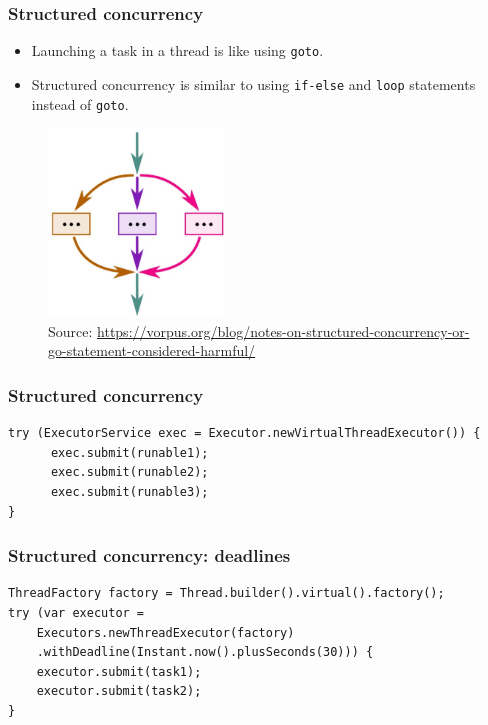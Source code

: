 \documentclass[10pt,utf8]{beamer}
\begin{document}
\begin{frame}
    \frametitle{Structured concurrency}
    \begin{itemize}
        \item Launching a task in a thread is like using \texttt{goto}.
        \item Structured concurrency is similar to using \texttt{if-else} and \texttt{loop} statements instead of \texttt{goto}.
    \end{itemize}

    \begin{figure}
        \centering
        \includegraphics[height=5cm]{./img/structured_concurrency.eps}
        \caption{\tiny{Source: \url{https://vorpus.org/blog/notes-on-structured-concurrency-or-go-statement-considered-harmful/}}}
    \end{figure}
\end{frame}

\begin{frame}[fragile]
    \frametitle{Structured concurrency}

    \begin{lstlisting}[style=java]
try (ExecutorService exec = Executor.newVirtualThreadExecutor()) {
      exec.submit(runable1);
      exec.submit(runable2);
      exec.submit(runable3);
}
    \end{lstlisting}
\end{frame}

\begin{frame}[fragile]
    \frametitle{Structured concurrency: deadlines}

    \begin{lstlisting}[style=java]
ThreadFactory factory = Thread.builder().virtual().factory();
try (var executor = 
    Executors.newThreadExecutor(factory)
    .withDeadline(Instant.now().plusSeconds(30))) {
    executor.submit(task1);
    executor.submit(task2);
}
    \end{lstlisting}
\end{frame}
\end{document}
